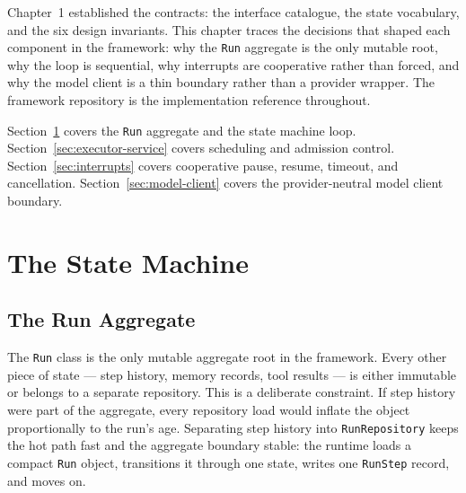 

Chapter~1 established the contracts: the interface catalogue, the state vocabulary,
and the six design invariants.
This chapter traces the decisions that shaped each component in the framework:
why the \texttt{Run} aggregate is the only mutable root, why the loop is sequential,
why interrupts are cooperative rather than forced, and why the model client is a
thin boundary rather than a provider wrapper.
The framework repository is the implementation reference throughout.

Section~\ref{sec:state-machine} covers the \texttt{Run} aggregate and the state
machine loop.
Section~\ref{sec:executor-service} covers scheduling and admission control.
Section~\ref{sec:interrupts} covers cooperative pause, resume, timeout, and
cancellation.
Section~\ref{sec:model-client} covers the provider-neutral model client boundary.

\section{The State Machine}
\label{sec:state-machine}

\subsection{The Run Aggregate}
\label{subsec:run-aggregate}

The \texttt{Run} class is the only mutable aggregate root in the framework.
Every other piece of state — step history, memory records, tool results — is either
immutable or belongs to a separate repository.
This is a deliberate constraint.
If step history were part of the aggregate, every repository load would inflate
the object proportionally to the run's age.
Separating step history into \texttt{RunRepository} keeps the hot path fast and the
aggregate boundary stable: the runtime loads a compact \texttt{Run} object, transitions
it through one state, writes one \texttt{RunStep} record, and moves on.

